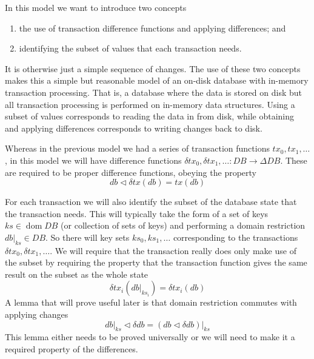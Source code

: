 \documentclass[11pt,a4paper]{article}
\DeclareMathOperator{\dom}{dom}
\newcommand\restrict[2]{\left.#1\right|_{#2}}
\begin{document}
In this model we want to introduce two concepts
\begin{enumerate}
\item the use of transaction difference functions and applying differences; and
\item identifying the subset of values that each transaction needs.
\end{enumerate}
It is otherwise just a simple sequence of changes. The use of these two concepts
makes this a simple but reasonable model of an on-disk database with in-memory
transaction processing. That is, a database where the data is stored on disk
but all transaction processing is performed on in-memory data structures. Using
a subset of values corresponds to reading the data in from disk, while obtaining
and applying differences corresponds to writing changes back to disk.

Whereas in the previous model we had a series of transaction functions
$\mathit{tx}_0, \mathit{tx}_1, \ldots$, in this model we will have difference
functions
$\delta\mathit{tx}_0, \delta\mathit{tx}_1, \ldots : \mathit{DB} \to \Delta\mathit{DB}$. These are required to be proper difference functions, obeying the property
\begin{equation}
\label{eq:diff-fun}
db \triangleleft \delta\mathit{tx}(\mathit{db}) = \mathit{tx}(\mathit{db})
\end{equation}

For each transaction we will also identify the subset of the database state that
the transaction needs. This will typically take the form of a set of keys
$\mathit{ks} \in \dom{\mathit{DB}}$ (or collection of sets of keys) and
performing a domain restriction $\restrict{\mathit{db}}{\mathit{ks}} \in \mathit{DB}$.
So there will key sets $\mathit{ks}_0, \mathit{ks}_1, \ldots$ corresponding to
the transactions $\delta\mathit{tx}_0, \delta\mathit{tx}_1, \ldots$.
We will require that the transaction really does only make use of the subset
by requiring the property that the transaction function gives the same result
on the subset as the whole state
\begin{equation}
\label{eq:restrict}
  \delta\mathit{tx}_i(\restrict{\mathit{db}}{\mathit{ks}_i}) = \delta\mathit{tx}_i(\mathit{db})
\end{equation}
A lemma that will prove useful later is that domain restriction commutes with
applying changes
\begin{equation}
\label{eq:restriction}
  \restrict{\mathit{db}}{\mathit{ks}} \triangleleft \delta\mathit{db}
=
  \restrict{\left(\mathit{db} \triangleleft \delta\mathit{db}\right)}{\mathit{ks}}
\end{equation}
This lemma either needs to be proved universally or we will need to make it a
required property of the differences.
\end{document}
